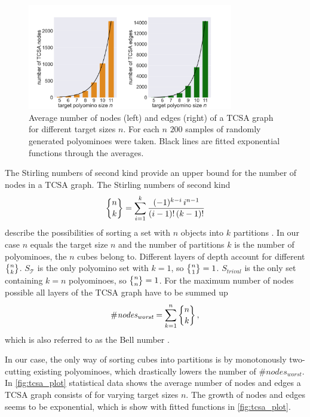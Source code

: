 \begin{figure}
	\centering
	\includegraphics[width=0.8\textwidth]{figures/plots/tcsa_nodes_edges.pdf}
	\caption[Average two-cut-sub-assembly nodes and edges for target size $n$.]{Average number of nodes (left) and edges (right) of a TCSA graph for different target sizes $n$. For each $n$ $200$ samples of randomly generated polyominoes were taken. Black lines are fitted exponential functions through the averages.}
	\label{fig:tcsa_plot}
\end{figure}

The Stirling numbers of second kind provide an upper bound for the number of nodes in a TCSA graph.
The Stirling numbers of second kind
\begin{equation}
\bracenom{n}{k} = \sum_{i=1}^{k} \frac{(-1)^{k-i} \, i^{n-1}}{(i-1)! \, (k-1)!}
\end{equation}
describe the possibilities of sorting a set with $n$ objects into $k$ partitions \cite{jelliss1991}.
In our case $n$ equals the target size $n$ and the number of partitions $k$ is the number of polyominoes, the $n$ cubes belong to.
Different layers of depth account for different $\bracenom{n}{k}$.
$S_\mathcal{T}$ is the only polyomino set with $k=1$, so $\bracenom{n}{1} = 1$.
$S_{trival}$ is the only set containing $k=n$ polyominoes, so $\bracenom{n}{n} = 1$.
For the maximum number of nodes possible all layers of the TCSA graph have to be summed up
\begin{equation}
\#\textit{nodes}_\textit{worst} = \sum_{k=1}^{n} \bracenom{n}{k} \, ,
\end{equation}
which is also referred to as the Bell number \cite{jelliss1991}.

In our case, the only way of sorting cubes into partitions is by monotonously two-cutting existing polyominoes, which drastically lowers the number of $\#\textit{nodes}_\textit{worst}$.
In \autoref{fig:tcsa_plot} statistical data shows the average number of nodes and edges a TCSA graph consists of for varying target sizes $n$.
The growth of nodes and edges seems to be exponential, which is show with fitted functions in \autoref{fig:tcsa_plot}. 

